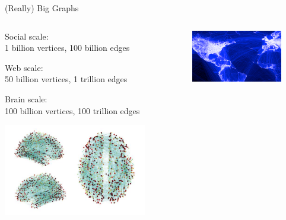 \begin{frame}{(Really) Big Graphs}

\begin{columns}[T]
\begin{column}{0.6\textwidth}
\BI
\item Social scale:\\
1 billion vertices, 100 billion edges
\item Web scale:\\
50 billion vertices, 1 trillion edges
\item Brain scale:\\
100 billion vertices, 100 trillion edges	
\EI
\begin{center}
\includegraphics[width=0.80\textwidth]{figs/xx/brain.png}\\	
\end{center}
\end{column}
\begin{column}{0.4\textwidth}
\begin{center}
\includegraphics[width=0.80\textwidth]{figs/xx/fb.png}\\	
~\\

\end{center}
\end{column}
\end{columns}
\end{frame}
